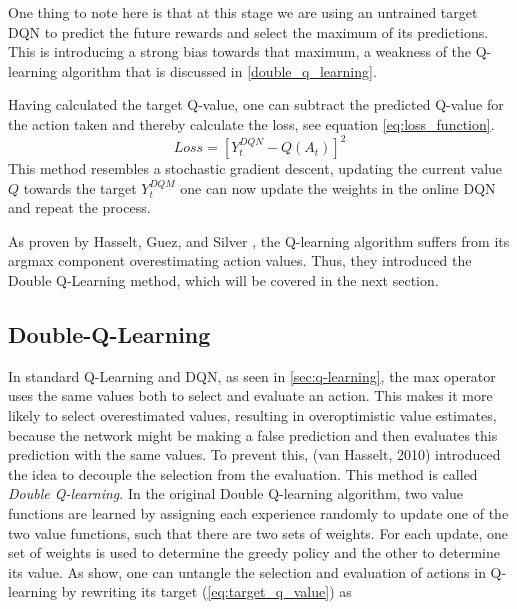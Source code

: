 \documentclass[12pt,a4paper]{article}
\begin{document}
One thing to note here is that at this stage we are using an untrained target DQN to predict the future rewards and select the maximum of its predictions. This is introducing a strong bias towards that maximum, a weakness of the Q-learning algorithm that is discussed in \ref{double_q_learning}. 

Having calculated the target Q-value, one can subtract the predicted Q-value for the action taken and thereby calculate the loss, see equation \ref{eq:loss_function}.
\begin{equation}
    \label{eq:loss_function}
    Loss = [Y_t^{DQN} - Q(A_t)]^2
\end{equation}
This method resembles a stochastic gradient descent, updating the current value $Q$ towards the target $Y_t^{DQM}$ one can now update the weights in the online DQN and repeat the process.

As proven by Hasselt, Guez, and Silver \cite{VanHasselt2015}, the Q-learning algorithm suffers from its argmax component overestimating action values. Thus, they introduced the Double Q-Learning method, which will be covered in the next section.

\subsection{Double-Q-Learning}\label{sec:double_q_learning}
In standard Q-Learning and DQN, as seen in \ref{sec:q-learning}, the max operator uses the same values both to select and evaluate an action. This makes it more likely to select overestimated values, resulting in overoptimistic value estimates, because the network might be making a false prediction and then evaluates this prediction with the same values. To prevent this, (van Hasselt, 2010) introduced the idea to decouple the selection from the evaluation. This method is called {\it Double Q-learning}. In the original Double Q-learning algorithm, two value functions are learned by assigning each experience randomly to update one of the two value functions, such that there are two sets of weights. For each update, one set of weights is used to determine the greedy policy and the other to determine its value. As \cite{VanHasselt2015} show, one can untangle the selection and evaluation of actions in Q-learning by rewriting its target (\ref{eq:target_q_value}) as
\end{document}
